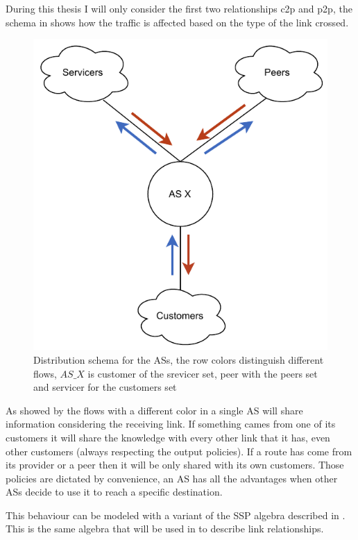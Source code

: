 During this thesis I will only consider the first two relationships \ac{c2p} and
\ac{p2p}, the schema in  shows how the traffic is affected
based on the type of the link crossed.

\begin{figure}[h]
    \centering
    \includegraphics[scale=0.75]{images/BGP/ASKnowledgeDistribution.pdf}
	\caption{Distribution schema for the \acp{AS}, the row colors distinguish
	different flows, $AS\_X$ is customer of the srevicer set, peer with the
	peers set and servicer for the customers set}
    \label{fig:AS_flow}
\end{figure}


As showed by the flows with a different color in  a single
\ac{AS} will share information considering the receiving link.
If something cames from one of its customers it will share the knowledge with
every other link that it has, even other customers (always respecting the output policies).
If a route has come from its provider or a peer then it will be only shared with 
its own customers.
Those policies are dictated by convenience, an \ac{AS} has all the advantages when
other \acp{AS} decide to use it to reach a specific destination.

This behaviour can be modeled with a variant of the \ac{SSP} algebra described
in \cite{daggitt2018rate}.
This is the same algebra that will be used in  to describe link
relationships.

